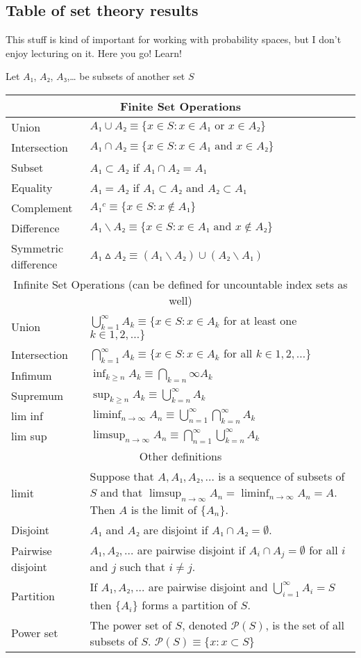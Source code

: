 \subsection{Table of set theory results}

This stuff is kind of important for working with probability spaces,
but I don't enjoy lecturing on it.  Here you go!  Learn!

Let $A₁$, $A₂$, $A₃$,… be subsets of another set $S$

\begin{fullwidth}
\begin{tabular}{lp{4in}}
  \toprule
  \multicolumn{2}{c}{Finite Set Operations} \\
  \midrule
  Union        & $A₁ ∪ A₂ ≡ \{x ∈ S : x ∈ A₁ \text{ or } x∈ A₂\}$ \\
  Intersection & $A₁ ∩ A₂ ≡ \{x ∈ S : x ∈ A₁ \text{ and } x ∈ A₂\}$ \\
  Subset       & $A₁ ⊂ A₂$ if $A₁ ∩ A₂ = A₁$ \\
  Equality     & $A₁ = A₂$ if $A₁ ⊂ A₂$ and $A₂ ⊂ A₁$ \\
  Complement   & $A₁^c ≡ \{x ∈ S : x ∉ A₁\}$ \\
  Difference   & $A₁ ∖ A₂ ≡ \{x ∈ S : x ∈ A₁ \text{ and } x ∉ A₂\}$ \\
  Symmetric difference & $A₁ ▵ A₂ ≡ (A₁ ∖ A₂) ∪ (A₂ ∖ A₁)$ \\
  \midrule
  \multicolumn{2}{c}{Infinite Set Operations (can be defined for uncountable index sets as well)} \\
  \midrule
  Union        & $⋃_{k=1}^∞ A_k ≡ \{x ∈ S : x ∈ A_k$ for at least one $k ∈ 1,2,…\}$ \\
  Intersection & $⋂_{k=1}^∞ A_k ≡ \{x ∈ S : x ∈ A_k$ for all $k ∈ 1,2,…\}$ \\
  Infimum      & $\inf_{k ≥ n} A_k ≡ ⋂_{k=n}∞ A_k$ \\
  Supremum     & $\sup_{k ≥ n} A_k ≡ ⋃_{k=n}^∞ A_k$ \\
  lim inf      & $\liminf_{n \to ∞} A_n ≡ ⋃_{n=1}^∞ ⋂_{k=n}^∞ A_k$ \\
  lim sup      & $\limsup_{n \to ∞} A_n ≡ ⋂_{n=1}^∞ ⋃_{k=n}^∞ A_k$ \\
  \midrule
  \multicolumn{2}{c}{Other definitions} \\
  \midrule
  limit 
  & Suppose that $A, A₁, A₂, …$ is a sequence of subsets of $S$ and that $\limsup_{n → ∞} A_n = \liminf_{n → ∞} A_n = A$.
  Then $A$ is the limit of $\{A_n\}$. \\
  Disjoint 
  & $A₁$ and $A₂$ are disjoint if $A₁ ∩ A₂ = ∅$. \\
  Pairwise disjoint 
  & $A₁, A₂, …$ are pairwise disjoint if $A_i ∩ A_j = ∅$ for all $i$ and $j$ such that $i ≠ j$. \\
  Partition & If $A₁,A₂,…$ are pairwise disjoint and $⋃_{i=1}^∞ A_i = S$ then $\{A_i\}$ forms a partition of $S$. \\
  Power set & The power set of $S$, denoted $\mathcal{P}(S)$, is the set of all subsets of $S$.
  $\mathcal{P}(S) ≡ \{x : x ⊂ S\}$ \\
\bottomrule
\end{tabular}
\end{fullwidth}

